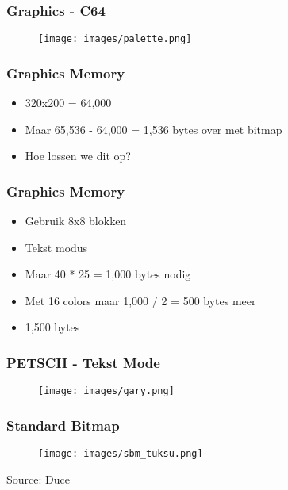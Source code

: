 \begin{frame}
\frametitle{Graphics - C64}

\begin{figure}
\texttt{[image: images/palette.png]}
\end{figure}

\end{frame}


\begin{frame}
\frametitle{Graphics Memory}

\begin{itemize}
\item 320x200 = 64,000
\item Maar 65,536 - 64,000 = 1,536 bytes over met bitmap
\item Hoe lossen we dit op?
\end{itemize}

\end{frame}


\begin{frame}
\frametitle{Graphics Memory}

\begin{itemize}
\item Gebruik 8x8 blokken
\item Tekst modus
\item Maar 40 * 25 = 1,000 bytes nodig
\item Met 16 colors maar 1,000 / 2 = 500 bytes meer
\item 1,500 bytes
\end{itemize}

\end{frame}


\begin{frame}
\frametitle{PETSCII - Tekst Mode}

\begin{figure}
\texttt{[image: images/gary.png]}
\end{figure}

\end{frame}


\begin{frame}
\frametitle{Standard Bitmap}

\begin{figure}
\texttt{[image: images/sbm\_tuksu.png]}
\end{figure}

\begin{center}
Source: Duce
\end{center}

\end{frame}

